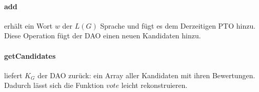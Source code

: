 \documentclass[a4paper,12pt]{report}
\begin{document}
\paragraph*{add}
erhält ein Wort $w$ der $L(G)$ Sprache und fügt es dem Derzeitigen PTO hinzu. Diese Operation fügt der DAO einen neuen Kandidaten hinzu.

\paragraph*{getCandidates}
liefert $K_G$ der DAO zurück: ein Array aller Kandidaten mit ihren Bewertungen. Dadurch lässt sich die Funktion $vote$ leicht rekonstruieren.




\end{document}

